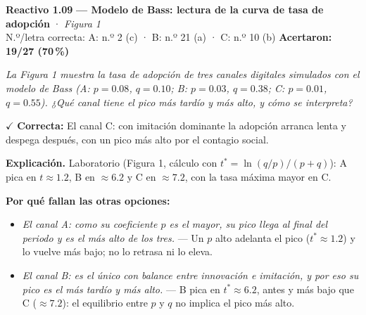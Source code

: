 \documentclass[10pt,letterpaper]{article}
\begin{document}
\begin{minipage}{\textwidth}
{\color{guinda}\textbf{Reactivo 1.09}} \textbf{— Modelo de Bass: lectura de la curva de tasa de adopción} · \textit{Figura 1}\\[-1pt]
{\scriptsize N.º/letra correcta: A: n.º 2 (c) · B: n.º 21 (a) · C: n.º 10 (b) \hfill \textbf{Acertaron: 19/27 (70\,\%)}}

\textit{La Figura 1 muestra la tasa de adopción de tres canales digitales simulados con el modelo de Bass (A: $p=0.08$, $q=0.10$; B: $p=0.03$, $q=0.38$; C: $p=0.01$, $q=0.55$). ¿Qué canal tiene el pico más tardío y más alto, y cómo se interpreta?}

\textcolor{verde}{$\checkmark$} \textbf{Correcta:} El canal C: con imitación dominante la adopción arranca lenta y despega después, con un pico más alto por el contagio social.

\textbf{Explicación.} Laboratorio (Figura 1, cálculo con $t^\ast=\ln(q/p)/(p+q)$): A pica en $t\approx1.2$, B en $\approx6.2$ y C en $\approx7.2$, con la tasa máxima mayor en C.

\textbf{Por qué fallan las otras opciones:}
\begin{itemize}[itemsep=0pt,topsep=1pt,leftmargin=1.3em,parsep=0pt]
\item[\textcolor{rojo}{$\times$}] \textit{El canal A: como su coeficiente $p$ es el mayor, su pico llega al final del periodo y es el más alto de los tres.} --- Un $p$ alto adelanta el pico ($t^\ast\approx1.2$) y lo vuelve más bajo; no lo retrasa ni lo eleva.
\item[\textcolor{rojo}{$\times$}] \textit{El canal B: es el único con balance entre innovación e imitación, y por eso su pico es el más tardío y más alto.} --- B pica en $t^\ast\approx6.2$, antes y más bajo que C ($\approx7.2$): el equilibrio entre $p$ y $q$ no implica el pico más alto.
\end{itemize}
\end{minipage}\par\vspace{5pt}{\color{gray!40}\hrule}\vspace{5pt}
\end{document}

